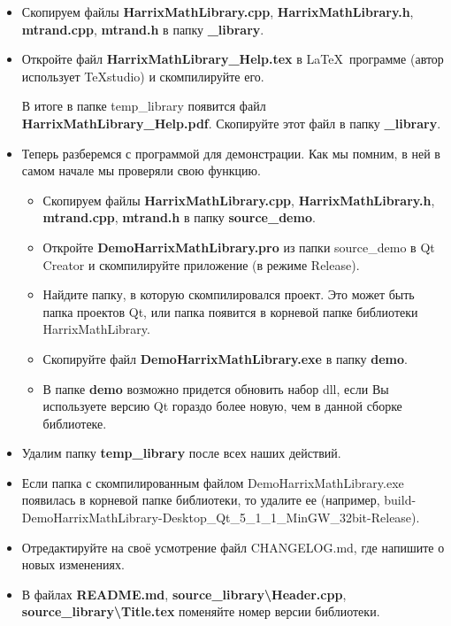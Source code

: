 \documentclass[a4paper,12pt]{article}
\begin{document}
\begin{itemize}
\item Скопируем файлы \textbf{HarrixMathLibrary.cpp}, \textbf{HarrixMathLibrary.h}, \textbf{mtrand.cpp}, \textbf{mtrand.h} в папку \textbf{\_library}.

\item Откройте файл \textbf{HarrixMathLibrary\_Help.tex } в \LaTeX \ программе (автор использует TeXstudio) и скомпилируйте его.

В итоге в папке temp\_library появится файл \textbf{HarrixMathLibrary\_Help.pdf}. Скопируйте этот файл в папку \textbf{\_library}.

\item Теперь разберемся с программой для демонстрации. Как мы помним, в ней в самом начале мы проверяли свою функцию. 
\begin{itemize}
\item Скопируем файлы \textbf{HarrixMathLibrary.cpp}, \textbf{HarrixMathLibrary.h}, \textbf{mtrand.cpp}, \textbf{mtrand.h} в папку \textbf{source\_demo}.
\item  Откройте \textbf{DemoHarrixMathLibrary.pro} из папки source\_demo в Qt Creator и скомпилируйте приложение (в режиме Release).
\item Найдите папку, в которую скомпилировался проект. Это может быть папка проектов Qt, или папка появится в корневой папке библиотеки HarrixMathLibrary.
\item Скопируйте файл \textbf{DemoHarrixMathLibrary.exe} в папку \textbf{demo}.
\item В папке \textbf{demo} возможно придется обновить набор dll, если Вы используете версию Qt гораздо более новую, чем в данной сборке библиотеке.
\end{itemize}
\item Удалим папку \textbf{temp\_library} после всех наших действий.
\item  Если папка с скомпилированным файлом DemoHarrixMathLibrary.exe появилась в корневой папке библиотеки, то удалите ее (например, build-DemoHarrixMathLibrary-Desktop\_Qt\_5\_1\_1\_MinGW\_32bit-Release).
\item Отредактируйте на своё усмотрение файл CHANGELOG.md, где напишите о новых изменениях.
\item В файлах \textbf{README.md}, \textbf{source\_library\textbackslash Header.cpp}, \textbf{source\_library\textbackslash Title.tex} поменяйте номер версии библиотеки.
\end{itemize}
\end{document}
